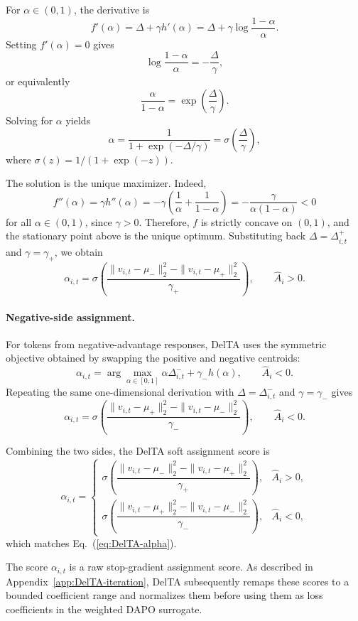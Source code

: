 \documentclass{llmxive}
\providecommand{\Eq}[1]{Eq.~(\ref{#1})}
\begin{document}
For \(\alpha\in(0,1)\), the derivative is
\[
f'(\alpha)
=
\Delta+\gamma h'(\alpha)
=
\Delta+\gamma\log\frac{1-\alpha}{\alpha}.
\]
Setting \(f'(\alpha)=0\) gives
\[
\log\frac{1-\alpha}{\alpha}
=
-\frac{\Delta}{\gamma},
\]
or equivalently
\[
\frac{\alpha}{1-\alpha}
=
\exp\!\left(\frac{\Delta}{\gamma}\right).
\]
Solving for \(\alpha\) yields
\[
\alpha
=
\frac{1}{1+\exp(-\Delta/\gamma)}
=
\sigma\!\left(\frac{\Delta}{\gamma}\right),
\]
where \(\sigma(z)=1/(1+\exp(-z))\).

The solution is the unique maximizer. Indeed,
\[
f''(\alpha)
=
\gamma h''(\alpha)
=
-\gamma
\left(
\frac{1}{\alpha}
+
\frac{1}{1-\alpha}
\right)
=
-\frac{\gamma}{\alpha(1-\alpha)}
<0
\]
for all \(\alpha\in(0,1)\), since \(\gamma>0\). Therefore, \(f\) is strictly
concave on \((0,1)\), and the stationary point above is the unique optimum.
Substituting back \(\Delta=\Delta_{i,t}^{+}\) and \(\gamma=\gamma_+\), we obtain
\[
\alpha_{i,t}
=
\sigma\!\left(
\dfrac{
\|v_{i,t}-\mu_-\|_2^2
-
\|v_{i,t}-\mu_+\|_2^2
}{
\gamma_+
}
\right),
\qquad
\hat A_i>0.
\]

\paragraph{Negative-side assignment.}
For tokens from negative-advantage responses, DelTA uses the symmetric objective
obtained by swapping the positive and negative centroids:
\[
\alpha_{i,t}
=
\arg\max_{\alpha\in[0,1]}
\alpha \Delta_{i,t}^{-}
+
\gamma_- h(\alpha),
\qquad
\hat A_i<0.
\]
Repeating the same one-dimensional derivation with
\(\Delta=\Delta_{i,t}^{-}\) and \(\gamma=\gamma_-\) gives
\[
\alpha_{i,t}
=
\sigma\!\left(
\dfrac{
\|v_{i,t}-\mu_+\|_2^2
-
\|v_{i,t}-\mu_-\|_2^2
}{
\gamma_-
}
\right),
\qquad
\hat A_i<0.
\]

Combining the two sides, the DelTA soft assignment score is
\[
\alpha_{i,t}
=
\begin{cases}
\sigma\!\left(
\dfrac{
\|v_{i,t}-\mu_-\|_2^2
-
\|v_{i,t}-\mu_+\|_2^2
}{
\gamma_+
}
\right),
& \hat A_i>0,\\[1.2ex]
\sigma\!\left(
\dfrac{
\|v_{i,t}-\mu_+\|_2^2
-
\|v_{i,t}-\mu_-\|_2^2
}{
\gamma_-
}
\right),
& \hat A_i<0,
\end{cases}
\]
which matches \Eq{eq:DelTA-alpha}.

The score \(\alpha_{i,t}\) is a raw stop-gradient assignment score. As described
in Appendix~\ref{app:DelTA-iteration}, DelTA subsequently remaps these scores
to a bounded coefficient range and normalizes them before using them as loss
coefficients in the weighted DAPO surrogate.
\end{document}

